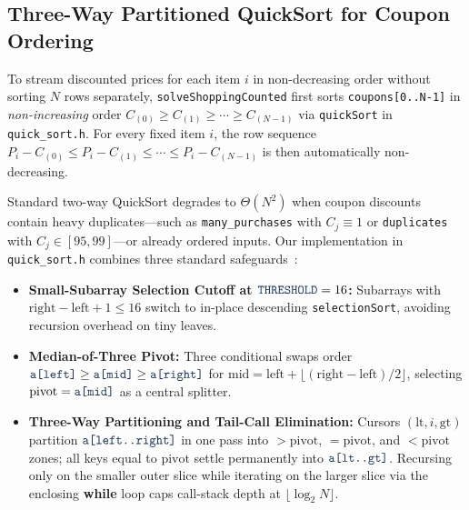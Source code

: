 \documentclass[10pt, a4paper]{article}
\newcommand{\code}[1]{\texttt{\color{primary!90!black}#1}}
\newcommand{\kw}[1]{\textbf{\color{primary}#1}}
\newcommand{\id}[1]{\ensuremath{\mathrm{#1}}}
\begin{document}
\subsection{Three-Way Partitioned QuickSort for Coupon Ordering}
To stream discounted prices for each item $i$ in non-decreasing order without sorting $N$ rows separately, \code{solveShoppingCounted} first sorts \code{coupons[0..N-1]} in \emph{non-increasing} order $C_{(0)} \ge C_{(1)} \ge \cdots \ge C_{(N-1)}$ via \code{quickSort} in \code{quick\_sort.h}. For every fixed item $i$, the row sequence $P_i - C_{(0)} \le P_i - C_{(1)} \le \cdots \le P_i - C_{(N-1)}$ is then automatically non-decreasing.

Standard two-way QuickSort degrades to $\Theta(N^2)$ when coupon discounts contain heavy duplicates---such as \code{many\_purchases} with $C_j \equiv 1$ or \code{duplicates} with $C_j \in [95, 99]$---or already ordered inputs. Our implementation in \code{quick\_sort.h} combines three standard safeguards~\cite{ads_slides2026, weiss1996}:
\begin{itemize}
  \item \textbf{\color{primary}Small-Subarray Selection Cutoff at $\code{THRESHOLD} = 16$:} Subarrays with $\id{right} - \id{left} + 1 \le 16$ switch to in-place descending \code{selectionSort}, avoiding recursion overhead on tiny leaves.
  \item \textbf{\color{primary}Median-of-Three Pivot:} Three conditional swaps order $\code{a[left]} \ge \code{a[mid]} \ge \code{a[right]}$ for $\id{mid} = \id{left} + \lfloor(\id{right} - \id{left})/2\rfloor$, selecting $\id{pivot} = \code{a[mid]}$ as a central splitter.
  \item \textbf{\color{primary}Three-Way Partitioning and Tail-Call Elimination:} Cursors $(\id{lt}, i, \id{gt})$ partition $\code{a[left..right]}$ in one pass into $> \id{pivot}$, $= \id{pivot}$, and $< \id{pivot}$ zones; all keys equal to $\id{pivot}$ settle permanently into $\code{a[lt..gt]}$. Recursing only on the smaller outer slice while iterating on the larger slice via the enclosing \kw{while} loop caps call-stack depth at $\lfloor \log_2 N \rfloor$.
\end{itemize}
\end{document}
